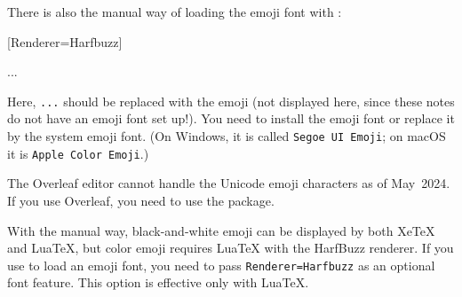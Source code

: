 There is also the manual way of loading the emoji font with :
%
\begin{ExampleCode}
\usepackage{fontspec}
[Renderer=Harfbuzz]

{\emojifont ...}
\end{ExampleCode}
%
Here, \verb|...| should be replaced with the emoji
(not displayed here, since these notes do not have an emoji font set up!).
You need to install the emoji font or replace it by the system emoji font.
(On Windows, it is called \texttt{Segoe UI Emoji};
on macOS it is \texttt{Apple Color Emoji}.)

\begin{overleaf}
The Overleaf editor cannot handle the Unicode emoji characters as of May~2024.
If you use Overleaf, you need to use the  package.
\end{overleaf}

\begin{warning}
With the manual way, black-and-white emoji can be displayed by both XeTeX and LuaTeX,
but color emoji requires LuaTeX with the HarfBuzz renderer.
If you use  to load an emoji font,
you need to pass \verb|Renderer=Harfbuzz| as an optional font feature.
This option is effective only with LuaTeX.
\end{warning}
